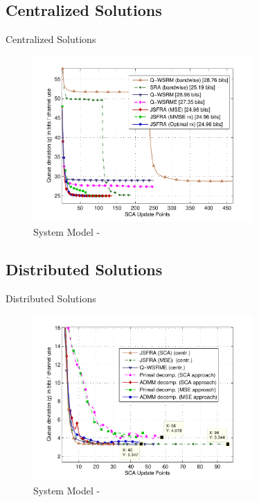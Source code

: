 \documentclass[9pt]{beamer}
\begin{document}
\subsection{Centralized Solutions}

\begin{frame}{Centralized Solutions}
\begin{figure}
	\centering
	\includegraphics[width=0.75\textwidth]{fig-2-5}
	\caption{System Model - }
\end{figure}
\end{frame}

\subsection{Distributed Solutions}

\begin{frame}{Distributed Solutions}
	\begin{figure}
		\centering
		\includegraphics[width=0.75\textwidth]{fig-3-2}
		\caption{System Model - }
	\end{figure}
\end{frame}
\end{document}
